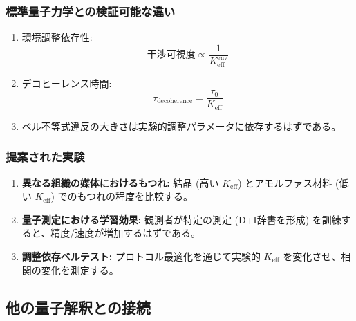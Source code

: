\documentclass[11pt,a4paper]{article}
\begin{document}
	\subsubsection{標準量子力学との検証可能な違い}
	\begin{enumerate}
		\item 環境調整依存性:
		\begin{equation}
			\text{干渉可視度} \propto \frac{1}{K_{\mathrm{eff}}^{\text{env}}}
		\end{equation}
		
		\item デコヒーレンス時間:
		\begin{equation}
			\tau_{\text{decoherence}} = \frac{\tau_0}{K_{\mathrm{eff}}}
		\end{equation}
		
		\item ベル不等式違反の大きさは実験的調整パラメータに依存するはずである。
	\end{enumerate}
	
	\subsubsection{提案された実験}
	\begin{enumerate}
		\item \textbf{異なる組織の媒体におけるもつれ:} 結晶 (高い $K_{\mathrm{eff}}$) とアモルファス材料 (低い $K_{\mathrm{eff}}$) でのもつれの程度を比較する。
		
		\item \textbf{量子測定における学習効果:} 観測者が特定の測定 (D+I辞書を形成) を訓練すると、精度/速度が増加するはずである。
		
		\item \textbf{調整依存ベルテスト:} プロトコル最適化を通じて実験的 $K_{\mathrm{eff}}$ を変化させ、相関の変化を測定する。
	\end{enumerate}
	
	\subsection{他の量子解釈との接続}
	\label{subsec:interpretations}
	
\end{document}
